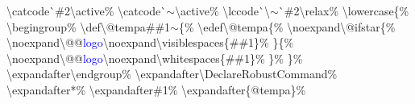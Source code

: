 \begin{linenumbers}
\hspace*{1.2em}\textbackslash catcode\`{}\#2\textbackslash active\%\newline
\hspace*{1.2em}\textbackslash catcode\`{}$\sim$\textbackslash active\%\newline
\hspace*{1.2em}\textbackslash lccode\`{}\textbackslash $\sim$\`{}\#2\textbackslash relax\%\newline
\hspace*{1.2em}\textbackslash lowercase\{\%\newline
\hspace*{2.4em}\textbackslash begingroup\%\newline
\hspace*{2.4em}\textbackslash def\textbackslash @tempa\#\#1$\sim$\{\%\newline
\hspace*{4.8em}\textbackslash edef\textbackslash @tempa\{\%\newline
\hspace*{4.8em}\textbackslash noexpand\textbackslash @ifstar\{\%\newline
\hspace*{6.0em}\textbackslash noexpand\textbackslash @@\textcolor{blue}{logo}\textbackslash noexpand\textbackslash visiblespaces\{\#\#1\}\%\newline
\hspace*{4.8em}\}\{\%\newline
\hspace*{6.0em}\textbackslash noexpand\textbackslash @@\textcolor{blue}{logo}\textbackslash noexpand\textbackslash whitespaces\{\#\#1\}\%\newline
\hspace*{4.8em}\}\%\newline
\hspace*{3.6em}\}\%\newline
\hspace*{3.6em}\textbackslash expandafter\textbackslash endgroup\%\newline
\hspace*{3.6em}\textbackslash expandafter\textbackslash DeclareRobustCommand\%\newline
\hspace*{3.6em}\textbackslash expandafter*\%\newline
\hspace*{3.6em}\textbackslash expandafter\#1\%\newline
\hspace*{3.6em}\textbackslash expandafter\{@tempa\}\%\newline

\end{linenumbers}
